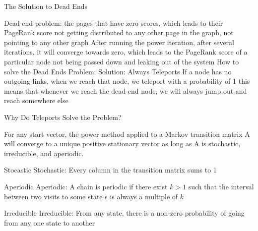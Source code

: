 \documentclass{beamer}
\begin{document}
\begin{frame}[t]{The Solution to Dead Ends}
\begin{outline}
\1 Dead end problem: the pages that have zero scores, which leads to their PageRank score not getting distributed to any other page in the graph, not pointing to any other graph
\1 After running the power iteration, after several iterations, it will converge towards zero, which leads to the PageRank score of a particular node not being passed down and leaking out of the system
\1 How to solve the Dead Ends Problem:
        \2 Solution: Always Teleports
        \2 If a node has no outgoing links, when we reach that node, we teleport with a probability of 1
        \2 this means that whenever we reach the dead-end node, we will always jump out and reach somewhere else
\end{outline}
\end{frame}
    
\begin{frame}[t]{Why Do Teleports Solve the Problem?}
\begin{outline}
\1 For any start vector, the power method applied to a Markov transition matrix A will converge to a unique positive stationary vector as long as A is stochastic, irreducible, and aperiodic.
\end{outline}
\end{frame}
   
\begin{frame}[t]{Stocastic}
    Stochastic: Every column in the transition matrix sums to 1
\end{frame}

\begin{frame}[t]{Aperiodic}
    Aperiodic: A chain is periodic if there exist $k > 1$ such that the interval between two visits to some state s is always a multiple of $k$
    
\end{frame}

\begin{frame}[t]{Irreducible}
    Irreducible: From any state, there is a non-zero probability of going from any one state to another
\end{frame}
\end{document}

